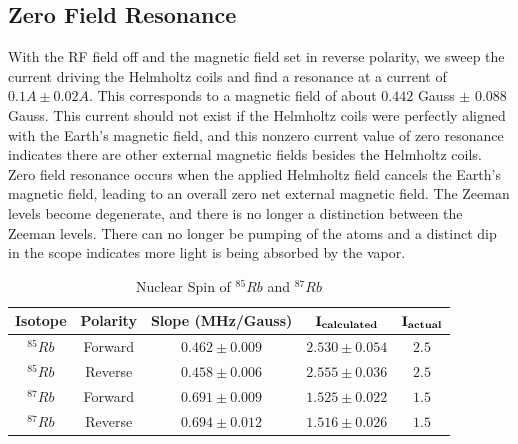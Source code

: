 \documentclass[%
 aip,
rsi,%
 amsmath,amssymb,
 reprint,%
author-numerical,%
]{revtex4-1}
\begin{document}
\subsection{Zero Field Resonance}
With the RF field off and the magnetic field set in reverse polarity, we sweep the current driving the Helmholtz coils and find a resonance at a current of $0.1A\pm0.02A$. This corresponds to a magnetic field of about $0.442$ Gauss $\pm$ $0.088$ Gauss. This current should not exist if the Helmholtz coils were perfectly aligned with the Earth's magnetic field, and this nonzero current value of zero resonance indicates there are other external magnetic fields besides the Helmholtz coils. \newline
\indent Zero field resonance occurs when the applied Helmholtz field cancels the Earth's magnetic field, leading to an overall zero net external magnetic field. The Zeeman levels become degenerate, and there is no longer a distinction between the Zeeman levels. There can no longer be pumping of the atoms and a distinct dip in the scope indicates more light is being absorbed by the vapor.

\begin{table}
\caption{\label{tab:table1}Nuclear Spin of $^{85}Rb$ and $^{87}Rb$  }
\begin{ruledtabular}
\begin{tabular}{ccccc}
\bf{Isotope} & \bf{Polarity} & \bf{Slope (MHz/Gauss)} & $\bf{I}_{calculated}$ & $\bf{I}_{actual}$\\ 
\hline
$^{85}Rb$ & Forward & $0.462\pm0.009$ & $2.530\pm0.054$ & $2.5$ \\
\hline 
$^{85}Rb$ & Reverse & $0.458\pm0.006$ & $2.555\pm0.036$ & $2.5$ \\
\hline
$^{87}Rb$ & Forward & $0.691\pm0.009$ & $1.525\pm0.022$ & $1.5$ \\
\hline
$^{87}Rb$ & Reverse& $0.694\pm0.012$ & $1.516\pm0.026$ & $1.5$ \\
\end{tabular}
\end{ruledtabular}
\end{table}
\end{document}
